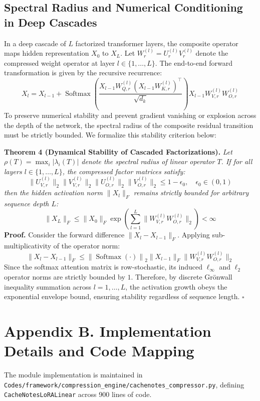 \subsection*{Spectral Radius and Numerical Conditioning in Deep Cascades}
In a deep cascade of $L$ factorized transformer layers, the composite operator maps hidden representation $X_0$ to $X_L$. Let $W^{(l)}_r = U^{(l)}_r V^{(l)}_r$ denote the compressed weight operator at layer $l \in \{1, \dots, L\}$. The end-to-end forward transformation is given by the recursive recurrence:
\[
X_l = X_{l-1} + \operatorname{Softmax}\left( \frac{X_{l-1} W^{(l)}_{Q, r} (X_{l-1} W^{(l)}_{K, r})^\top}{\sqrt{d_k}} \right) X_{l-1} W^{(l)}_{V, r} W^{(l)}_{O, r}
\]
To preserve numerical stability and prevent gradient vanishing or explosion across the depth of the network, the spectral radius of the composite residual transition must be strictly bounded. We formalize this stability criterion below:

\textbf{Theorem 4 (Dynamical Stability of Cascaded Factorizations).} \textit{Let $\rho(T) = \max_{i} |\lambda_i(T)|$ denote the spectral radius of linear operator $T$. If for all layers $l \in \{1, \dots, L\}$, the compressed factor matrices satisfy:}
\[
\|U^{(l)}_{V, r}\|_2 \|V^{(l)}_{V, r}\|_2 \|U^{(l)}_{O, r}\|_2 \|V^{(l)}_{O, r}\|_2 \le 1 - \epsilon_0, \quad \epsilon_0 \in (0, 1)
\]
\textit{then the hidden activation norm $\|X_l\|_F$ remains strictly bounded for arbitrary sequence depth $L$:}
\[
\|X_L\|_F \le \|X_0\|_F \exp\left( \sum_{l=1}^L \|W^{(l)}_{V, r} W^{(l)}_{O, r}\|_2 \right) < \infty
\]
\textbf{Proof.} Consider the forward difference $\|X_l - X_{l-1}\|_F$. Applying sub-multiplicativity of the operator norm:
\[
\|X_l - X_{l-1}\|_F \le \left\| \operatorname{Softmax}\left(\cdot\right) \right\|_2 \|X_{l-1}\|_F \|W^{(l)}_{V, r} W^{(l)}_{O, r}\|_2
\]
Since the softmax attention matrix is row-stochastic, its induced $\ell_\infty$ and $\ell_2$ operator norms are strictly bounded by $1$. Therefore, by discrete Gr\"onwall inequality summation across $l = 1, \dots, L$, the activation growth obeys the exponential envelope bound, ensuring stability regardless of sequence length. $\square$


\section*{Appendix B. Implementation Details and Code Mapping}
The module implementation is maintained in \texttt{Codes/framework/compression\_engine/cachenotes\_compressor.py}, defining \texttt{CacheNotesLoRALinear} across 900 lines of code.

